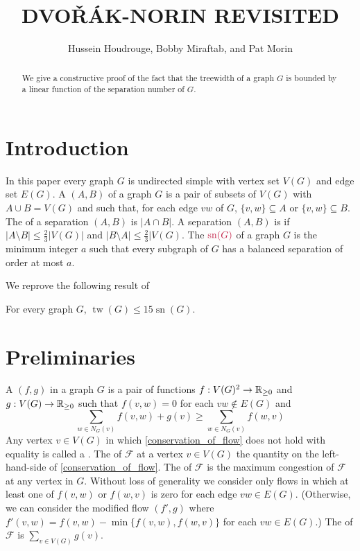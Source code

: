 \documentclass{patmorin}
\title{\MakeUppercase{Dvo\v{r}ák-Norin Revisited}}
\author{Hussein Houdrouge, Bobby Miraftab, and Pat Morin}
\date{}
\DeclareMathOperator{\sep}{sn}
\DeclareMathOperator{\tw}{tw}
\begin{document}
\maketitle

\begin{abstract}
  We give a constructive proof of the fact that the treewidth of a graph $G$ is bounded by a linear function of the separation number of $G$.
\end{abstract}


\section{Introduction}

In this paper every graph $G$ is undirected simple with vertex set $V(G)$ and edge set $E(G)$.  A  $(A,B)$ of a graph $G$ is a pair of subsets of $V(G)$ with $A\cup B= V(G)$ and such that, for each edge $vw$ of $G$, $\{v,w\}\subseteq A$ or $\{v,w\}\subseteq B$.  The  of a separation $(A,B)$ is $|A\cap B|$.  A separation $(A,B)$ is  if $|A\setminus B|\le \tfrac{2}{3}|V(G)|$ and $|B\setminus A|\le \tfrac{2}{3}|V(G)$.  The  $\mathdefin{\sep(G)}$ of a graph $G$ is the minimum integer $a$ such that every subgraph of $G$ has a balanced separation of order at most $a$.

We reprove the following result of \citet{dvorak.norin:treewidth}
\begin{thm}
  For every graph $G$, $\tw(G)\le 15\sep(G)$.
\end{thm}



\section{Preliminaries}


A  $(f,g)$ in a graph $G$ is a pair of functions $f:V(G)^2\to\mathbb{R}_{\ge 0}$ and $g:V(G)\to\mathbb{R}_{\ge 0}$ such that $f(v,w)=0$ for each $vw\not\in E(G)$ and
\begin{equation}
  \sum_{w\in N_G(v)} f(v,w) + g(v) \ge \sum_{w\in N_G(v)} f(w,v)
  \label{conservation_of_flow}
\end{equation}
Any vertex $v\in V(G)$ in which \cref{conservation_of_flow} does not hold with equality is called a .  The  of $\mathcal{F}$ at a vertex $v\in V(G)$ the quantity on the left-hand-side of \eqref{conservation_of_flow}.  The  of $\mathcal{F}$ is the maximum congestion of $\mathcal{F}$ at any vertex in $G$.  Without loss of generality we consider only flows in which at least one of $f(v,w)$ or $f(w,v)$ is zero for each edge $vw\in E(G)$.  (Otherwise, we can consider the modified flow $(f',g)$ where $f'(v,w)=f(v,w)-\min\{f(v,w),f(w,v)\}$ for each $vw\in E(G)$.)  The  of $\mathcal{F}$ is $\sum_{v\in V(G)} g(v)$.
\end{document}
